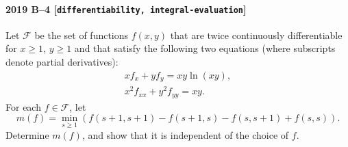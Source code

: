 \paragraph{2019 B--4 \textnormal{[\texttt{differentiability, integral-evaluation}]}}
Let $\mathcal{F}$ be the set of functions $f(x,y)$ that are twice continuously differentiable for $x \geq 1$, $y \geq 1$ and that satisfy the following two equations (where subscripts denote partial derivatives):
\begin{gather*}
xf_x + yf_y = xy \ln(xy), \\
x^2 f_{xx} + y^2 f_{yy} = xy.
\end{gather*}
For each $f \in \mathcal{F}$, let
\[
m(f) = \min_{s \geq 1} \left(f(s+1,s+1) - f(s+1,s) - f(s,s+1) + f(s,s) \right).
\]
Determine $m(f)$, and show that it is independent of the choice of $f$.
